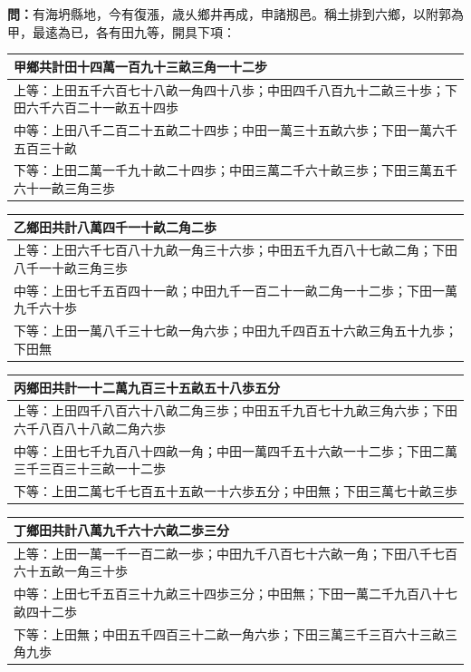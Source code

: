 \documentclass[11pt,a4paper]{article}
\newcommand{\Question}[1]{\par\noindent\textbf{\color{problemcolor}問：}#1\par}
\begin{document}
\Question{有海坍縣地，今有復漲，歳乆鄉井再成，申諸剏邑。稱土排到六鄉，以附郭為甲，最逺為已，各有田九等，開具下項：

\begin{longtable}{p{0.95\textwidth}}
\toprule
\textbf{甲鄉}共計田十四萬一百九十三畝三角一十二步\\
\midrule
\endhead
上等：上田五千六百七十八畝一角四十八歩；中田四千八百九十二畝三十歩；下田六千六百二十一畝五十四歩\\
中等：上田八千二百二十五畝二十四歩；中田一萬三十五畝六歩；下田一萬六千五百三十畝\\
下等：上田二萬一千九十畝二十四歩；中田三萬二千六十畝三歩；下田三萬五千六十一畝三角三歩\\
\bottomrule
\end{longtable}

\begin{longtable}{p{0.95\textwidth}}
\toprule
\textbf{乙鄉}田共計八萬四千一十畝二角二歩\\
\midrule
\endhead
上等：上田六千七百八十九畝一角三十六歩；中田五千九百八十七畝二角；下田八千一十畝三角三歩\\
中等：上田七千五百四十一畝；中田九千一百二十一畝二角一十二歩；下田一萬九千六十歩\\
下等：上田一萬八千三十七畝一角六歩；中田九千四百五十六畝三角五十九歩；下田無\\
\bottomrule
\end{longtable}

\begin{longtable}{p{0.95\textwidth}}
\toprule
\textbf{丙鄉}田共計一十二萬九百三十五畝五十八歩五分\\
\midrule
\endhead
上等：上田四千八百六十八畝二角三歩；中田五千九百七十九畝三角六歩；下田六千八百八十八畝二角六歩\\
中等：上田七千九百八十四畝一角；中田一萬四千五十六畝一十二歩；下田二萬三千三百三十三畝一十二歩\\
下等：上田二萬七千七百五十五畝一十六歩五分；中田無；下田三萬七十畝三歩\\
\bottomrule
\end{longtable}

\begin{longtable}{p{0.95\textwidth}}
\toprule
\textbf{丁鄉}田共計八萬九千六十六畝二歩三分\\
\midrule
\endhead
上等：上田一萬一千一百二畝一歩；中田九千八百七十六畝一角；下田八千七百六十五畝一角三十歩\\
中等：上田七千五百三十九畝三十四歩三分；中田無；下田一萬二千九百八十七畝四十二歩\\
下等：上田無；中田五千四百三十二畝一角六歩；下田三萬三千三百六十三畝三角九歩\\
\bottomrule
\end{longtable}

}
\end{document}
